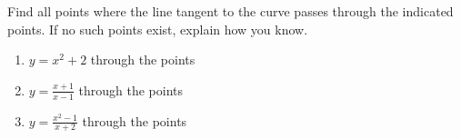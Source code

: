 \vskip1mm{}
\begin{embeddedproblem}
  Find all points where the
  line tangent to the curve passes through the indicated points. If no
  such points exist, explain how you know.
  \begin{enumerate}[label={\bf{}(\alph*)}]
  \item    $y=x^2+2$  through the points
    \begin{enumerate}[label={\bf{}(\roman*)}]
    \end{enumerate}
  \item    $y=\frac{x+1}{x-1}$  through the points
    \begin{enumerate}[label={\bf{}(\roman*)}]
    \end{enumerate}
  \item $y=\frac{x^2-1}{x+2}$  through the points
    \begin{enumerate}[label={\bf{}(\roman*)}]
    \end{enumerate}
  \end{enumerate}
  \vskip-4mm{}
\end{embeddedproblem}


